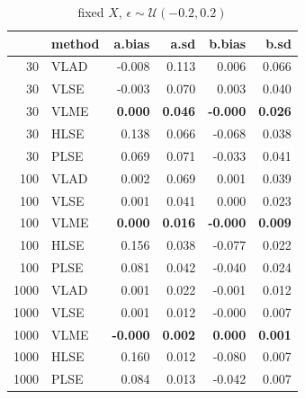 \documentclass[twoside]{article}
\begin{document}
\begin{table}[ht]
\centering
\caption{fixed $X$, $\epsilon \sim \mathcal{U}(-0.2,0.2)$}
\begin{tabular}{rlrrrr}
  \hline
 & method & a.bias & a.sd & b.bias & b.sd \\ 
  \hline
  30 & VLAD & -0.008 & 0.113 & 0.006 & 0.066 \\ 
  30 & VLSE & -0.003 & 0.070 & 0.003 & 0.040 \\ 
  30 & VLME & \textbf{0.000} & \textbf{0.046} & \textbf{-0.000} & \textbf{0.026} \\ 
  30 & HLSE & 0.138 & 0.066 & -0.068 & 0.038 \\ 
  30 & PLSE & 0.069 & 0.071 & -0.033 & 0.041 \\ 
  \hline
  100 & VLAD & 0.002 & 0.069 & 0.001 & 0.039 \\ 
  100 & VLSE & 0.001 & 0.041 & 0.000 & 0.023 \\ 
  100 & VLME & \textbf{0.000} & \textbf{0.016} & \textbf{-0.000} & \textbf{0.009} \\ 
  100 & HLSE & 0.156 & 0.038 & -0.077 & 0.022 \\ 
  100 & PLSE & 0.081 & 0.042 & -0.040 & 0.024 \\ 
  \hline
  1000 & VLAD & 0.001 & 0.022 & -0.001 & 0.012 \\ 
  1000 & VLSE & 0.001 & 0.012 & -0.000 & 0.007 \\ 
  1000 & VLME & \textbf{-0.000} & \textbf{0.002} & \textbf{0.000} & \textbf{0.001} \\ 
  1000 & HLSE & 0.160 & 0.012 & -0.080 & 0.007 \\ 
  1000 & PLSE & 0.084 & 0.013 & -0.042 & 0.007 \\ 
   \hline
\end{tabular}
\end{table}
\end{document}
